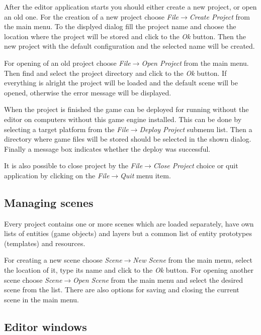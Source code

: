 After the editor application starts you should either create a new project, or open an old one. For the creation of a new project choose \emph{File}$\rightarrow$\emph{Create Project} from the main menu. To the displyed dialog fill the project name and choose the location where the project will be stored and click to the \emph{Ok} button. Then the new project with the default configuration and the selected name will be created.

For opening of an old project choose \emph{File}$\rightarrow$\emph{Open Project} from the main menu. Then find and select the project directory and click to the \emph{Ok} button. If everything is alright the project will be loaded and the default scene will be opened, otherwise the error message will be displayed.

When the project is finished the game can be deployed for running without the editor on computers without this game engine installed. This can be done by selecting a target platform from the \emph{File}$\rightarrow$\emph{Deploy Project} submenu list. Then a directory where game files will be stored should be selected in the shown dialog. Finally a message box indicates whether the deploy was successful.

It is also possible to close project by the \emph{File}$\rightarrow$\emph{Close Project} choice or quit application by clicking on the \emph{File}$\rightarrow$\emph{Quit} menu item.

\subsection{Managing scenes}

Every project contains one or more scenes which are loaded separately, have own lists of entities (game objects) and layers but a common list of entity prototypes (templates) and resources.

For creating a new scene choose \emph{Scene}$\rightarrow$\emph{New Scene} from the main menu, select the location of it, type its name and click to the \emph{Ok} button. For opening another scene choose \emph{Scene}$\rightarrow$\emph{Open Scene} from the main menu and select the desired scene from the list. There are also options for saving and closing the current scene in the main menu.

\subsection{Editor windows}

